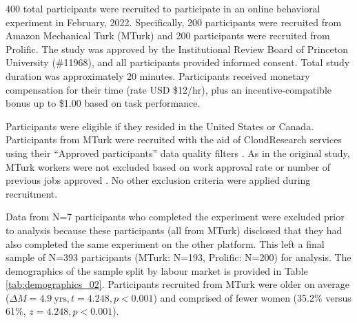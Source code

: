 \documentclass[a4paper,notitlepage,12pt]{article}
\begin{document}
\begin{refsection}[supp]
400 total participants were recruited to participate in an online behavioral experiment in February, 2022. Specifically, 200 participants were recruited from Amazon Mechanical Turk (MTurk) and 200 participants were recruited from Prolific. The study was approved by the Institutional Review Board of Princeton University (\#11968), and all participants provided informed consent. Total study duration was approximately 20 minutes. Participants received monetary compensation for their time (rate USD \$12/hr), plus an incentive-compatible bonus up to \$1.00 based on task performance. 

Participants were eligible if they resided in the United States or Canada. Participants from MTurk were recruited with the aid of CloudResearch services \cite{litman2017turkprime-2} using their ``Approved participants''  data quality filters \cite{cloudresearch_2020-2}. As in the original study, MTurk workers were not excluded based on work approval rate or number of previous jobs approved \cite{robinson2019tapped-2}. No other exclusion criteria were applied during recruitment.

Data from N=7 participants who completed the experiment were excluded prior to analysis because these participants (all from MTurk) disclosed that they had also completed the same experiment on the other platform. This left a final sample of N=393 participants (MTurk: N=193, Prolific: N=200) for analysis. The demographics of the sample split by labour market is provided in Table \ref{tab:demographics_02}. Participants recruited from MTurk were older on average ($\Delta M = 4.9 \ \text{yrs}, t = 4.248, p < 0.001$) and comprised of fewer women (35.2\% versus 61\%, $z = 4.248, p < 0.001$). 


\end{refsection}
\end{document}
